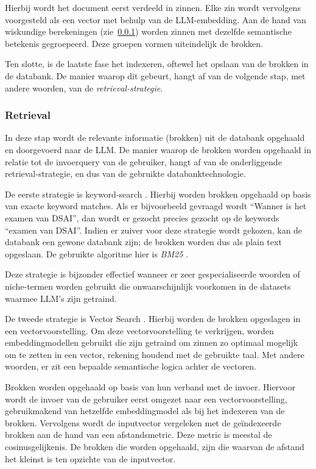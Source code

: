 \begin{enumerate}
\begin{itemize}
            Hierbij wordt het document eerst verdeeld in zinnen. Elke zin wordt vervolgens voorgesteld als een vector met behulp van de LLM-embedding. Aan de hand van wiskundige berekeningen (zie~\ref{subsubsec:retrieval}) worden zinnen met dezelfde semantische betekenis gegroepeerd. Deze groepen vormen uiteindelijk de brokken.
        \end{itemize}
\end{enumerate}

Ten slotte, is de laatste fase het indexeren, oftewel het opslaan van de brokken in de databank. De manier waarop dit gebeurt, hangt af van de volgende stap, met andere woorden, van de \emph{retrieval-strategie}. 

\subsubsection{Retrieval}%
\label{subsubsec:retrieval}
In deze stap wordt de relevante informatie (brokken) uit de databank opgehaald en doorgevoerd naar de \acrshort{LLM}. De manier waarop de brokken worden opgehaald in relatie tot de invoerquery van de gebruiker, hangt af van de onderliggende retrieval-strategie, en dus van de gebruikte databanktechnologie.

De eerste strategie is keyword-search \autocite{Bansal2023}. Hierbij worden brokken opgehaald op basis van exacte keyword matches. Als er bijvoorbeeld gevraagd wordt ``Wanner is het examen van DSAI'', dan wordt er gezocht precies gezocht op de keywords ``examen van DSAI''. Indien er zuiver voor deze strategie wordt gekozen, kan de databank een gewone databank zijn; de brokken worden dus als plain text opgeslaan. De gebruikte algoritme hier is \emph{BM25} \autocite{Bansal2023}.

Deze strategie is bijzonder effectief wanneer er zeer gespecialiseerde woorden of niche-termen worden gebruikt die onwaarschijnlijk voorkomen in de datasets waarmee \acrshort{LLM}'s zijn getraind.

De tweede strategie is Vector Search \autocite{Bansal2023}. Hierbij worden de brokken opgeslagen in een vectorvoorstelling. Om deze vectorvoorstelling te verkrijgen, worden embeddingmodellen gebruikt die zijn getraind om zinnen zo optimaal mogelijk om te zetten in een vector, rekening houdend met de gebruikte taal. Met andere woorden, er zit een bepaalde semantische logica achter de vectoren.

Brokken worden opgehaald op basis van hun verband met de invoer. Hiervoor wordt de invoer van de gebruiker eerst omgezet naar een vectorvoorstelling, gebruikmakend van hetzelfde embeddingmodel als bij het indexeren van de brokken. Vervolgens wordt de inputvector vergeleken met de geïndexeerde brokken aan de hand van een afstandsmetric. Deze metric is meestal de cosinusgelijkenis. De brokken die worden opgehaald, zijn die waarvan de afstand het kleinst is ten opzichte van de inputvector.

